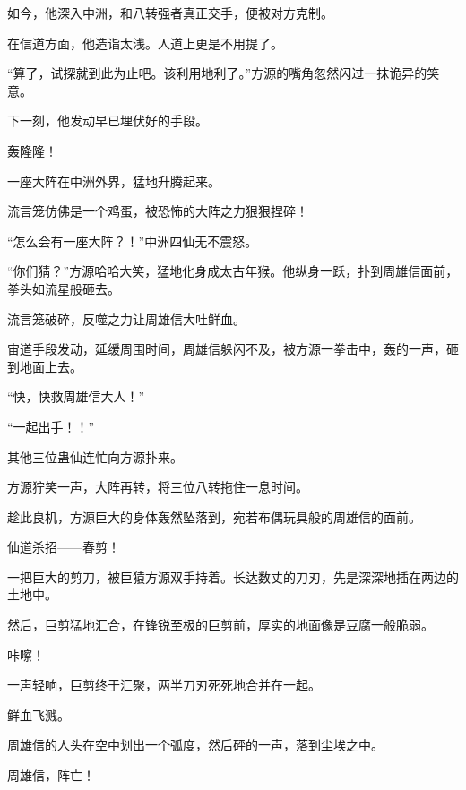 \begin{this_body}
如今，他深入中洲，和八转强者真正交手，便被对方克制。

在信道方面，他造诣太浅。人道上更是不用提了。

“算了，试探就到此为止吧。该利用地利了。”方源的嘴角忽然闪过一抹诡异的笑意。

下一刻，他发动早已埋伏好的手段。

轰隆隆！

一座大阵在中洲外界，猛地升腾起来。

流言笼仿佛是一个鸡蛋，被恐怖的大阵之力狠狠捏碎！

“怎么会有一座大阵？！”中洲四仙无不震怒。

“你们猜？”方源哈哈大笑，猛地化身成太古年猴。他纵身一跃，扑到周雄信面前，拳头如流星般砸去。

流言笼破碎，反噬之力让周雄信大吐鲜血。

宙道手段发动，延缓周围时间，周雄信躲闪不及，被方源一拳击中，轰的一声，砸到地面上去。

“快，快救周雄信大人！”

“一起出手！！”

其他三位蛊仙连忙向方源扑来。

方源狞笑一声，大阵再转，将三位八转拖住一息时间。

趁此良机，方源巨大的身体轰然坠落到，宛若布偶玩具般的周雄信的面前。

仙道杀招——春剪！

一把巨大的剪刀，被巨猿方源双手持着。长达数丈的刀刃，先是深深地插在两边的土地中。

然后，巨剪猛地汇合，在锋锐至极的巨剪前，厚实的地面像是豆腐一般脆弱。

咔嚓！

一声轻响，巨剪终于汇聚，两半刀刃死死地合并在一起。

鲜血飞溅。

周雄信的人头在空中划出一个弧度，然后砰的一声，落到尘埃之中。

周雄信，阵亡！

\end{this_body}

